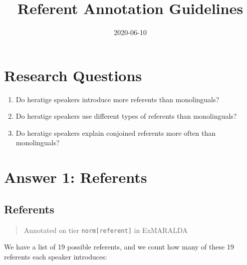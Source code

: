\documentclass[
]{book}
\title{Referent Annotation Guidelines}
\author{}
\date{\vspace{-2.5em}2020-06-10}
\begin{document}
\maketitle

{
\setcounter{tocdepth}{1}
\tableofcontents
}
\hypertarget{research-questions}{%
\chapter{Research Questions}\label{research-questions}}

\begin{enumerate}
\def\labelenumi{\arabic{enumi}.}
\item
  Do heratige speakers introduce more referents than monolinguals?
\item
  Do heratige speakers use different types of referents than monolinguals?
\item
  Do heratige speakers explain conjoined referents more often than monolinguals?
\end{enumerate}

\hypertarget{answer-1-referents}{%
\chapter{Answer 1: Referents}\label{answer-1-referents}}

\hypertarget{referents}{%
\section{Referents}\label{referents}}

\begin{quote}
Annotated on tier \texttt{norm{[}referent{]}} in ExMARALDA
\end{quote}

We have a list of 19 possible referents, and we count how many of these 19 referents each speaker introduces:
\end{document}

